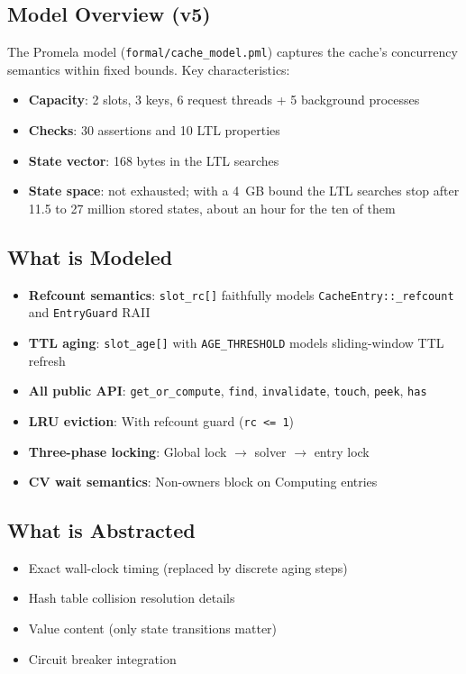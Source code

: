 \documentclass[11pt,a4paper]{article}
\begin{document}
\subsection{Model Overview (v5)}

The Promela model (\texttt{formal/cache\_model.pml}) captures the cache's
concurrency semantics within fixed bounds. Key characteristics:

\begin{itemize}
\item \textbf{Capacity}: 2 slots, 3 keys, 6 request threads + 5 background processes
\item \textbf{Checks}: 30 assertions and 10 LTL properties
\item \textbf{State vector}: 168 bytes in the LTL searches
\item \textbf{State space}: not exhausted; with a 4~GB bound the LTL searches stop
      after 11.5 to 27 million stored states, about an hour for the ten of them
\end{itemize}

\subsection{What is Modeled}

\begin{itemize}
\item \textbf{Refcount semantics}: \texttt{slot\_rc[]} faithfully models 
      \texttt{CacheEntry::\_refcount} and \texttt{EntryGuard} RAII
\item \textbf{TTL aging}: \texttt{slot\_age[]} with \texttt{AGE\_THRESHOLD} 
      models sliding-window TTL refresh
\item \textbf{All public API}: \texttt{get\_or\_compute}, \texttt{find}, 
      \texttt{invalidate}, \texttt{touch}, \texttt{peek}, \texttt{has}
\item \textbf{LRU eviction}: With refcount guard (\texttt{rc <= 1})
\item \textbf{Three-phase locking}: Global lock $\to$ solver $\to$ entry lock
\item \textbf{CV wait semantics}: Non-owners block on Computing entries
\end{itemize}

\subsection{What is Abstracted}

\begin{itemize}
\item Exact wall-clock timing (replaced by discrete aging steps)
\item Hash table collision resolution details
\item Value content (only state transitions matter)
\item Circuit breaker integration
\end{itemize}
\end{document}
